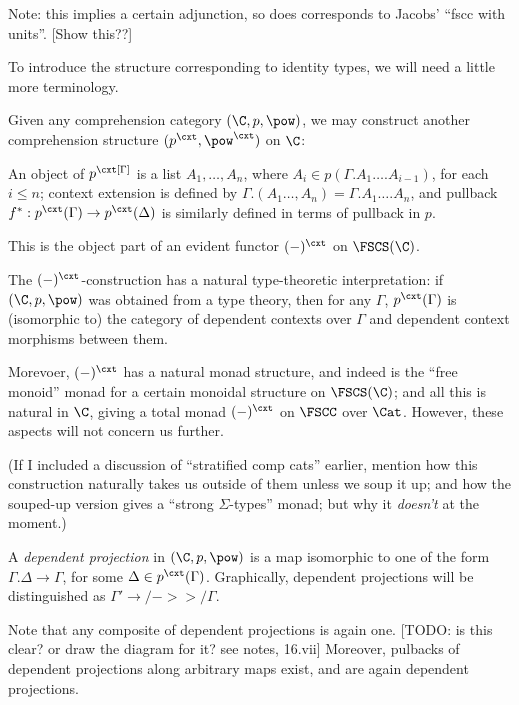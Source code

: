 Note: this implies a certain adjunction, so does corresponds to Jacobs' ``fscc with units''.  [Show this??]

To introduce the structure corresponding to identity types, we will need a little more terminology.

\begin{mydefinition}
Given any comprehension category $(\C,p,\pow)$, we may construct another comprehension structure $(p^\cxt,\pow^\cxt)$ on $\C$:

An object of $p^\cxt[\Gamma]$ is a list $A_1,\ldots,A_n$, where $A_i \in p(\Gamma . A_1 \ldots . A_{i-1})$, for each $i \leq n$; context extension is defined by $\Gamma . (A_1 \ldots , A_n) = \Gamma . A_1 \ldots . A_n$, and pullback $f^* : p^\cxt(\Gamma) \to p^\cxt(\Delta)$ is similarly defined in terms of pullback in $p$.

This is the object part of an evident functor $(-)^\cxt$ on $\FSCS(\C)$.
\end{mydefinition}

The $(-)^\cxt$-construction has a natural type-theoretic interpretation: if $(\C,p,\pow)$ was obtained from a type theory, then for any $\Gamma$, $p^\cxt(\Gamma)$ is (isomorphic to) the category of dependent contexts over $\Gamma$ and dependent context morphisms between them.

Morevoer, $(-)^\cxt$ has a natural monad structure, and indeed is the ``free monoid'' monad for a certain monoidal structure on $\FSCS(\C)$; and all this is natural in $\C$, giving a total monad $(-)^\cxt$ on $\FSCC$ over $\Cat$.  However, these aspects will not concern us further.

(If I included a discussion of ``stratified comp cats'' earlier, mention how this construction naturally takes us outside of them unless we soup it up; and how the souped-up version gives a ``strong $\Sigma$-types'' monad; but why it \emph{doesn't} at the moment.)

\begin{definition} A \emph{dependent projection} in $(\C,p,\pow)$ is a map isomorphic to one of the form $\Gamma.\Delta \to \Gamma$, for some $\Delta \in p^\cxt(\Gamma)$.  Graphically, dependent projections will be distinguished as
$\Gamma' \to/->>/ \Gamma$.
\end{definition}

Note that any composite of dependent projections is again one.  [TODO: is this clear?  or draw the diagram for it?  see notes, 16.vii]  Moreover, pulbacks of dependent projections along arbitrary maps exist, and are again dependent projections.


